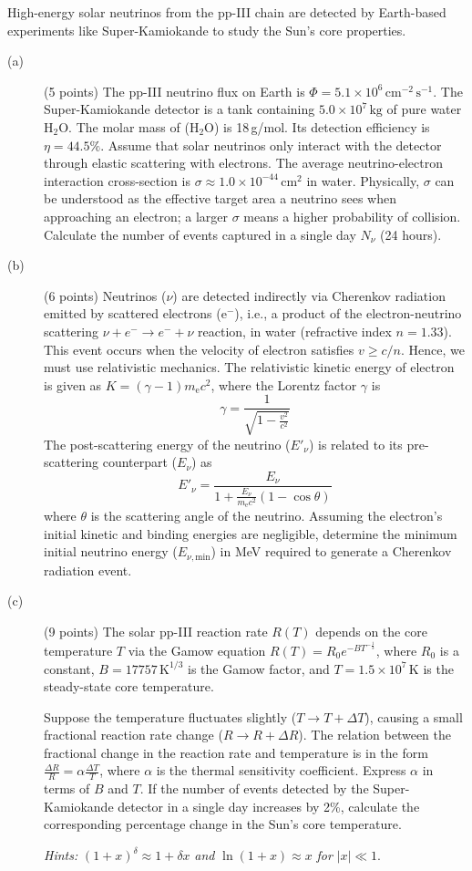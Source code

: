 High-energy solar neutrinos from the pp-III chain are detected by Earth-based
experiments like Super-Kamiokande to study the Sun's core properties.

\begin{description}
\item[(a)] (5 points) The pp-III neutrino flux on Earth is
  $\Phi = 5.1 \times 10^6\,\mathrm{cm^{-2}\,s^{-1}}$. The Super-Kamiokande
  detector is a tank containing $5.0 \times 10^7\,\mathrm{kg}$ of pure water
  $\mathrm{H_2O}$. The molar mass of ($\mathrm{H_2O}$) is 18\,g/mol. Its
  detection efficiency is $\eta = 44.5\%$. Assume that solar neutrinos only
  interact with the detector through elastic scattering with electrons. The
  average neutrino-electron interaction cross-section is
  $\sigma \approx 1.0 \times 10^{-44}\,\mathrm{cm^2}$ in water. Physically,
  $\sigma$ can be understood as the effective target area a neutrino sees
  when approaching an electron; a larger $\sigma$ means a higher probability
  of collision. Calculate the number of events captured in a single day
  $N_\nu$ (24 hours).
\item[(b)] (6 points) Neutrinos ($\nu$) are detected indirectly via Cherenkov
  radiation emitted by scattered electrons ($\mathrm{e}^-$), i.e., a product
  of the electron-neutrino scattering $\nu + e^- \to e^- + \nu$ reaction, in
  water (refractive index $n = 1.33$). This event occurs when the velocity of
  electron satisfies $v \ge c/n$. Hence, we must use relativistic mechanics.
  The relativistic kinetic energy of electron is given as
  $K = (\gamma - 1)m_{\mathrm{e}}c^2$, where the Lorentz factor $\gamma$ is
  \[ \gamma = \frac{1}{\sqrt{1 - \frac{v^2}{c^2}}} \]
  The post-scattering energy of the neutrino ($E'_\nu$) is related to its
  pre-scattering counterpart ($E_\nu$) as
  \[ E'_\nu = \frac{E_\nu}{1 + \frac{E_\nu}{m_{\mathrm{e}}c^2}(1 - \cos\theta)} \]
  where $\theta$ is the scattering angle of the neutrino. Assuming the
  electron's initial kinetic and binding energies are negligible, determine
  the minimum initial neutrino energy ($E_{\nu,\mathrm{min}}$) in MeV required
  to generate a Cherenkov radiation event.
\item[(c)] (9 points) The solar pp-III reaction rate $R(T)$ depends on the
  core temperature $T$ via the Gamow equation
  $R(T) = R_0 e^{-BT^{-\frac{1}{3}}}$, where $R_0$ is a constant,
  $B = 17757\,\mathrm{K}^{1/3}$ is the Gamow factor, and
  $T = 1.5 \times 10^7\,\mathrm{K}$ is the steady-state core temperature.

  Suppose the temperature fluctuates slightly ($T \to T + \Delta T$), causing
  a small fractional reaction rate change ($R \to R + \Delta R$). The relation
  between the fractional change in the reaction rate and temperature is in
  the form $\frac{\Delta R}{R} = \alpha\frac{\Delta T}{T}$, where $\alpha$ is
  the thermal sensitivity coefficient. Express $\alpha$ in terms of $B$ and
  $T$. If the number of events detected by the Super-Kamiokande detector in a
  single day increases by 2\%, calculate the corresponding percentage change
  in the Sun's core temperature.

  \textit{Hints:} $(1 + x)^\delta \approx 1 + \delta x$ \textit{and}
  $\ln(1 + x) \approx x$ \textit{for} $|x| \ll 1$.
\end{description}
